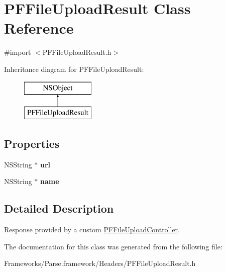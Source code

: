 \hypertarget{interface_p_f_file_upload_result}{}\section{P\+F\+File\+Upload\+Result Class Reference}
\label{interface_p_f_file_upload_result}


{\ttfamily \#import $<$P\+F\+File\+Upload\+Result.\+h$>$}

Inheritance diagram for P\+F\+File\+Upload\+Result\+:\begin{figure}[H]
\begin{center}
\leavevmode
\includegraphics[height=2.000000cm]{interface_p_f_file_upload_result}
\end{center}
\end{figure}
\subsection*{Properties}
\begin{DoxyCompactItemize}
\item 
\hypertarget{interface_p_f_file_upload_result_ae7b93204f1f73e3a0a702e14186a60ce}{}N\+S\+String $\ast$ {\bfseries url}\label{interface_p_f_file_upload_result_ae7b93204f1f73e3a0a702e14186a60ce}

\item 
\hypertarget{interface_p_f_file_upload_result_a4f3b735ab23b9d318d8265c346008993}{}N\+S\+String $\ast$ {\bfseries name}\label{interface_p_f_file_upload_result_a4f3b735ab23b9d318d8265c346008993}

\end{DoxyCompactItemize}


\subsection{Detailed Description}
Response provided by a custom {\ttfamily \hyperlink{protocol_p_f_file_upload_controller-p}{P\+F\+File\+Upload\+Controller}}. 

The documentation for this class was generated from the following file\+:\begin{DoxyCompactItemize}
\item 
Frameworks/\+Parse.\+framework/\+Headers/P\+F\+File\+Upload\+Result.\+h\end{DoxyCompactItemize}

